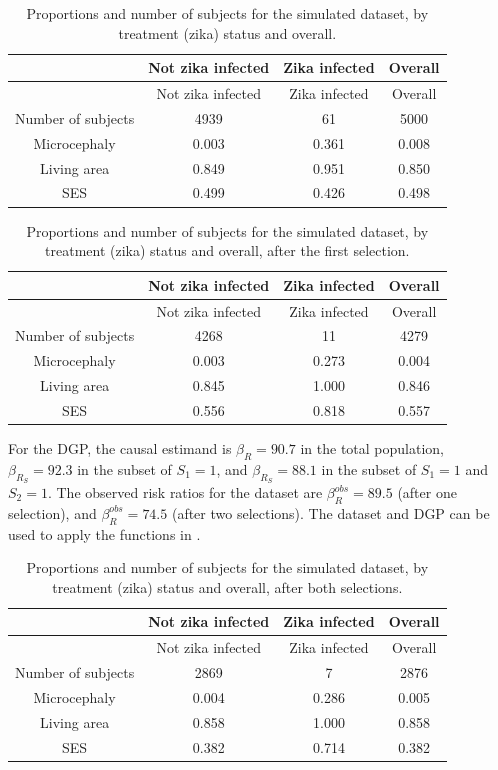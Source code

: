 \begin{longtable}[]{@{}cccc@{}}
\caption{\label{tab:total} Proportions and number of subjects for the simulated dataset, by treatment (zika) status and overall.}\tabularnewline
\toprule\noalign{}
& Not zika infected & Zika infected & Overall \\
\midrule\noalign{}
\endfirsthead
\toprule\noalign{}
& Not zika infected & Zika infected & Overall \\
\midrule\noalign{}
\endhead
\bottomrule\noalign{}
\endlastfoot
Number of subjects & 4939 & 61 & 5000 \\
Microcephaly & 0.003 & 0.361 & 0.008 \\
Living area & 0.849 & 0.951 & 0.850 \\
SES & 0.499 & 0.426 & 0.498 \\
\end{longtable}

\begin{longtable}[]{@{}cccc@{}}
\caption{\label{tab:sel1} Proportions and number of subjects for the simulated dataset, by treatment (zika) status and overall, after the first selection.}\tabularnewline
\toprule\noalign{}
& Not zika infected & Zika infected & Overall \\
\midrule\noalign{}
\endfirsthead
\toprule\noalign{}
& Not zika infected & Zika infected & Overall \\
\midrule\noalign{}
\endhead
\bottomrule\noalign{}
\endlastfoot
Number of subjects & 4268 & 11 & 4279 \\
Microcephaly & 0.003 & 0.273 & 0.004 \\
Living area & 0.845 & 1.000 & 0.846 \\
SES & 0.556 & 0.818 & 0.557 \\
\end{longtable}

For the DGP, the causal estimand is \(\beta_R=90.7\) in the total population,
\(\beta_{R_{S}}=92.3\) in the subset of \(S_1=1\), and \(\beta_{R_{S}}=88.1\) in the
subset of \(S_1=1\) and \(S_2=1\). The observed risk ratios for the dataset are
\(\beta_R^{obs}=89.5\) (after one selection), and \(\beta_R^{obs}=74.5\) (after two
selections). The dataset and DGP can be used to apply the functions in .

\begin{longtable}[]{@{}cccc@{}}
\caption{\label{tab:sel2} Proportions and number of subjects for the simulated dataset, by treatment (zika) status and overall, after both selections.}\tabularnewline
\toprule\noalign{}
& Not zika infected & Zika infected & Overall \\
\midrule\noalign{}
\endfirsthead
\toprule\noalign{}
& Not zika infected & Zika infected & Overall \\
\midrule\noalign{}
\endhead
\bottomrule\noalign{}
\endlastfoot
Number of subjects & 2869 & 7 & 2876 \\
Microcephaly & 0.004 & 0.286 & 0.005 \\
Living area & 0.858 & 1.000 & 0.858 \\
SES & 0.382 & 0.714 & 0.382 \\
\end{longtable}

